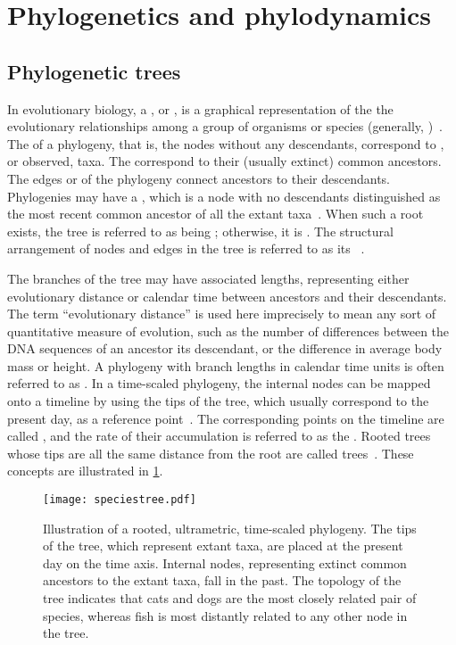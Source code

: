 \section{Phylogenetics and phylodynamics}
\label{sec:phylo}

\subsection{Phylogenetic trees}

In evolutionary biology, a , or , is a
graphical representation of the the evolutionary relationships among a group of
organisms or species (generally, )~\autocite{haeckel1866generelle}.
The  of a phylogeny, that is, the nodes without any descendants,
correspond to , or observed, taxa. The 
correspond to their (usually extinct) common ancestors. The edges or
 of the phylogeny connect ancestors to their descendants.
Phylogenies may have a , which is a node with no descendants
distinguished as the most recent common ancestor of all the extant
taxa~\autocite{harding1971probabilities}. When such a root exists, the tree is
referred to as being ; otherwise, it is . The
structural arrangement of nodes and edges in the tree is referred to as its
~\autocite{cavalli1967phylogenetic}. 

The branches of the tree may have associated lengths, representing either
evolutionary distance or calendar time between ancestors and their descendants.
The term ``evolutionary distance'' is used here imprecisely to mean any sort of
quantitative measure of evolution, such as the number of differences between
the DNA sequences of an ancestor its descendant, or the difference in average
body mass or height. A phylogeny with branch lengths in calendar time units is
often referred to as . In a time-scaled phylogeny, the
internal nodes can be mapped onto a timeline by using the tips of the tree,
which usually correspond to the present day, as a reference
point~\autocite{nee1992tempo}. The corresponding points on the timeline are
called , and the rate of their accumulation is referred
to as the . Rooted trees whose tips are all the same
distance from the root are called 
trees~\autocite{buneman1974note}. These concepts are illustrated in
\cref{fig:speciestree}.

\begin{figure}[ht]
  \centering
  \texttt{[image: speciestree.pdf]}
  \caption[Illustration of a rooted, ultrametric, time-scaled phylogeny.]
    {Illustration of a rooted, ultrametric, time-scaled phylogeny. The tips of
      the tree, which represent extant taxa, are placed at the present day on
      the time axis. Internal nodes, representing extinct common ancestors to
      the extant taxa, fall in the past. The topology of the tree indicates
      that cats and dogs are the most closely related pair of species, whereas
      fish is most distantly related to any other node in the tree.}
  \label{fig:speciestree}
\end{figure}

